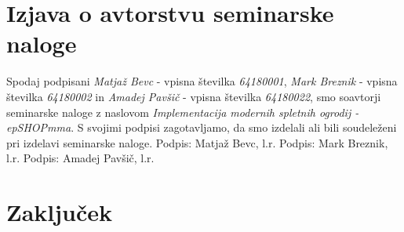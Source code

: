 \documentclass[a4paper,12pt]{report}
\newcommand{\naslov}     {Implementacija modernih spletnih ogrodij - epSHOPmma}
\newcommand{\prviavtor}  {Matjaž Bevc}
\newcommand{\prviindeks} {64180001}
\newcommand{\drugiavtor} {Mark Breznik}
\newcommand{\drugiindeks}{64180002}
\newcommand{\tretjiavtor} {Amadej Pavšič}
\newcommand{\tretjiindeks}{64180022}
\begin{document}
\chapter{Izjava o avtorstvu seminarske naloge}

Spodaj podpisani \textit{\prviavtor} - vpisna številka \textit{\prviindeks}, \textit{\drugiavtor} -  vpisna številka \textit{\drugiindeks} in \textit{\tretjiavtor} -  vpisna številka \textit{\tretjiindeks}, smo soavtorji seminarske naloge z naslovom \textit{\naslov}. S svojimi podpisi zagotavljamo, da smo izdelali ali bili soudeleženi pri izdelavi seminarske naloge.
\newline
\newline
Podpis: {\prviavtor}, l.r. \newline
Podpis: {\drugiavtor}, l.r. \newline
Podpis: {\tretjiavtor}, l.r. \newline



\chapter{Zaključek}
\end{document}
